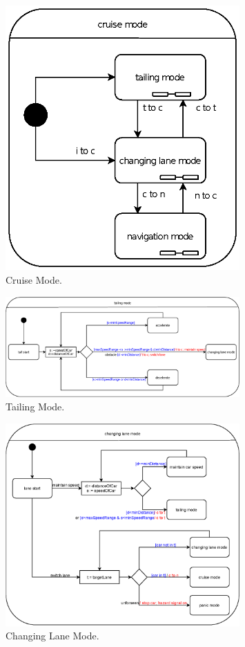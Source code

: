 \documentclass[12pt]{article}
\begin{document}
\begin{spacing}{1.5}
\begin{figure}[h!]
	\centering
		\includegraphics[width=0.8\textwidth]{./A2_Figures/A2_SOEN331_Cruise.eps}
		  \caption{Cruise Mode.}
  \label{fig:cruise-mode-fig}
\end{figure}

\begin{figure}[h!]
	\centering
		\includegraphics[width=0.8\textwidth]{./A2_Figures/A2_SOEN331_Tailing.eps}
		  \caption{Tailing Mode.}
  \label{fig:tailing-mode-fig}
\end{figure}

\begin{figure}[h!]
	\centering
		\includegraphics[width=0.8\textwidth]{./A2_Figures/A2_SOEN331_Changing_Lane.eps}
		  \caption{Changing Lane Mode.}
  \label{fig:changing-lane-mode-fig}
\end{figure}


\end{spacing}
\end{document}
